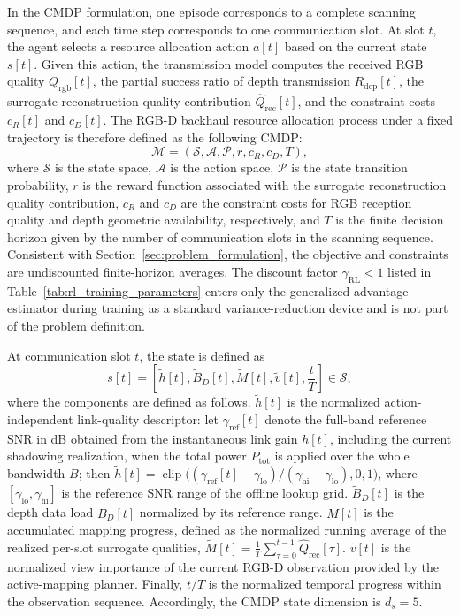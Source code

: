 \documentclass[journal]{IEEEtran}
\begin{document}
In the CMDP formulation, one episode corresponds to a complete scanning sequence, and each time step corresponds to one communication slot. At slot $t$, the agent selects a resource allocation action $a[t]$ based on the current state $s[t]$. Given this action, the transmission model computes the received RGB quality $Q_{\mathrm{rgb}}[t]$, the partial success ratio of depth transmission $R_{\mathrm{dep}}[t]$, the surrogate reconstruction quality contribution $\hat{Q}_{\mathrm{rec}}[t]$, and the constraint costs $c_R[t]$ and $c_D[t]$. The RGB-D backhaul resource allocation process under a fixed trajectory is therefore defined as the following CMDP:
\begin{equation}
\mathcal{M}
=
\left(
\mathcal{S},
\mathcal{A},
\mathcal{P},
r,
c_R,
c_D,
T
\right),
\end{equation}
where $\mathcal{S}$ is the state space, $\mathcal{A}$ is the action space, $\mathcal{P}$ is the state transition probability, $r$ is the reward function associated with the surrogate reconstruction quality contribution, $c_R$ and $c_D$ are the constraint costs for RGB reception quality and depth geometric availability, respectively, and $T$ is the finite decision horizon given by the number of communication slots in the scanning sequence. Consistent with Section~\ref{sec:problem_formulation}, the objective and constraints are undiscounted finite-horizon averages. The discount factor $\gamma_{\mathrm{RL}}<1$ listed in Table~\ref{tab:rl_training_parameters} enters only the generalized advantage estimator during training as a standard variance-reduction device and is not part of the problem definition.

At communication slot $t$, the state is defined as
\begin{equation}
s[t]
=
\left[
\tilde{h}[t],
\tilde{B}_{D}[t],
\tilde{M}[t],
\tilde{v}[t],
\frac{t}{T}
\right]
\in \mathcal{S},
\end{equation}
where the components are defined as follows.
$\tilde{h}[t]$ is the normalized action-independent link-quality descriptor: let $\gamma_{\mathrm{ref}}[t]$ denote the full-band reference SNR in dB obtained from the instantaneous link gain $h[t]$, including the current shadowing realization, when the total power $P_{\mathrm{tot}}$ is applied over the whole bandwidth $B$; then $\tilde{h}[t]=\operatorname{clip}\big((\gamma_{\mathrm{ref}}[t]-\gamma_{\mathrm{lo}})/(\gamma_{\mathrm{hi}}-\gamma_{\mathrm{lo}}),0,1\big)$, where $[\gamma_{\mathrm{lo}},\gamma_{\mathrm{hi}}]$ is the reference SNR range of the offline lookup grid.
$\tilde{B}_{D}[t]$ is the depth data load $B_D[t]$ normalized by its reference range.
$\tilde{M}[t]$ is the accumulated mapping progress, defined as the normalized running average of the realized per-slot surrogate qualities, $\tilde{M}[t]=\frac{1}{T}\sum_{\tau=0}^{t-1}\hat{Q}_{\mathrm{rec}}[\tau]$.
$\tilde{v}[t]$ is the normalized view importance of the current RGB-D observation provided by the active-mapping planner.
Finally, $t/T$ is the normalized temporal progress within the observation sequence.
Accordingly, the CMDP state dimension is $d_s=5$.
\end{document}
